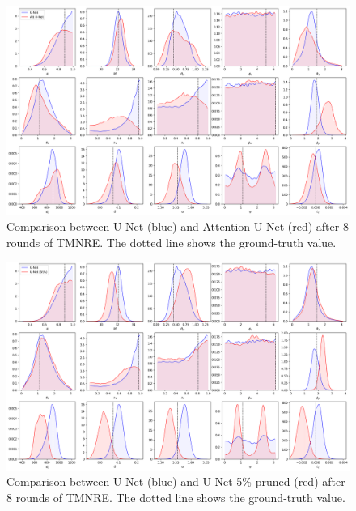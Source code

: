 \begin{appendices}
\begin{figure}[htb]
  \centering
  \includegraphics[width=0.85\linewidth]{media/images/Posteriors_AttentionUNet_2_round_8.png}
  \caption{Comparison between U-Net (blue) and Attention U-Net (red) after 8 rounds of TMNRE. The dotted line shows the ground-truth value.}
  \label{fig:posterior_attention_unet}
\end{figure}

\begin{figure}[htb]
  \centering
  \includegraphics[width=0.85\linewidth]{media/images/Posteriors_UNet_pruned5_2_round_8.png}
  \caption{Comparison between U-Net (blue) and U-Net 5\% pruned (red) after 8 rounds of TMNRE. The dotted line shows the ground-truth value.}
  \label{fig:posterior_unet_pruned_5pc}
\end{figure}


\end{appendices}
